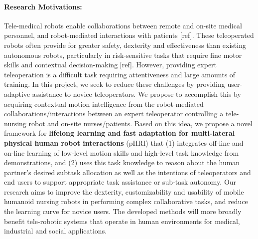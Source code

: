 \documentclass[letterpaper, 11 pt, onecolumn]{article}
\begin{document}
\paragraph*{Research Motivations:} 
Tele-medical robots enable collaborations between remote and on-site medical personnel, and robot-mediated interactions with patients [ref]. These teleoperated robots often provide for greater safety, dexterity and effectiveness than existing autonomous robots, particularly in risk-sensitive tasks that require fine motor skills and contextual decision-making [ref]. 
However, providing expert teleoperation is a difficult task requiring attentiveness and large amounts of training.
In this project, we seek to reduce these challenges by providing user-adaptive assistance to novice teleoperators.
We propose to accomplish this by acquiring contextual motion intelligence from the robot-mediated collaborations/interactions between an expert teleoperator controlling a tele-nursing robot and on-site nurses/patients.
Based on this idea, we propose a novel framework for \textbf{lifelong learning and fast adaptation for multi-lateral physical human robot interactions} (pHRI) that (1) integrates off-line and on-line learning of low-level motion skills and high-level task knowledge from demonstrations, and (2) uses this task knowledge to reason about the human partner's desired subtask allocation as well as the intentions of teleoperators and end users to support appropriate task assistance or sub-task autonomy. Our research aims to improve the dexterity, customizability and usability of mobile humanoid nursing robots in performing complex collaborative tasks, and reduce the learning curve for novice users. The developed methods will more broadly benefit tele-robotic systems that operate in human environments for medical, industrial and social applications. 

\end{document}
